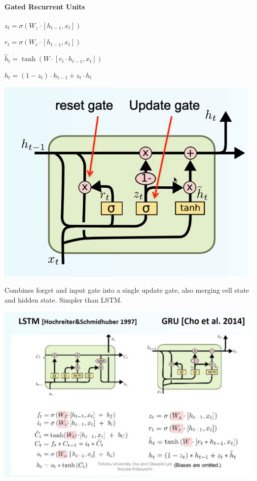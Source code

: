 \documentclass[10pt]{report}
\begin{document}
\paragraph{Gated Recurrent Units}
\begin{multicols}{2}
\begin{list}{}{}
	\item $z_t = \sigma(W_z\cdot[h_{t-1},x_t])$
	\item $r_t = \sigma(W_r\cdot[h_{t-1},x_t])$
	\item $\hat{h}_t = \tanh(W\cdot[r_t\cdot h_{t-1},x_t])$
	\item $h_t = (1-z_t)\cdot h_{t-1}+z_t\cdot\hat{h}_t$
\end{list}
\begin{center}
	\includegraphics[scale=0.5]{33.png}
\end{center}
\end{multicols}
Combines forget and input gate into a single update gate, also merging cell state and hidden state. Simpler than LSTM.
\begin{center}
	\includegraphics[scale=0.4]{34.png}
\end{center}
\end{document}
